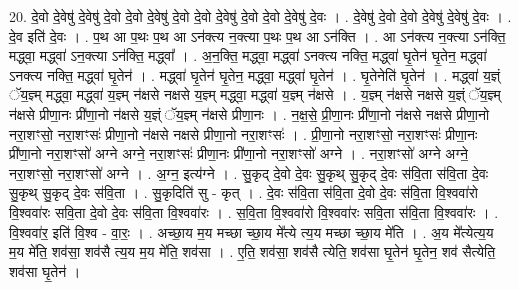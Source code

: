 \documentclass[17pt]{extarticle}
\begin{document}
20. दे॒वो दे॒वेषु॑ दे॒वेषु॑ दे॒वो दे॒वो दे॒वेषु॑ दे॒वो दे॒वो दे॒वेषु॑ दे॒वो दे॒वो दे॒वेषु॑ दे॒वः । . दे॒वेषु॑ दे॒वो दे॒वो दे॒वेषु॑ दे॒वेषु॑ दे॒वः । . दे॒व इति॑ दे॒वः । . प॒थ आ प॒थः प॒थ आ ऽन॑क्त्य न॒क्त्या प॒थः प॒थ आ ऽन॑क्ति । . आ ऽन॑क्त्य न॒क्त्या ऽन॑क्ति॒ मद्ध्वा॒ मद्ध्वा॑ ऽन॒क्त्या ऽन॑क्ति॒ मद्ध्वा᳚ । . अ॒न॒क्ति॒ मद्ध्वा॒ मद्ध्वा॑ ऽनक्त्य नक्ति॒ मद्ध्वा॑ घृ॒तेन॑ घृ॒तेन॒ मद्ध्वा॑ ऽनक्त्य नक्ति॒ मद्ध्वा॑ घृ॒तेन॑ । . मद्ध्वा॑ घृ॒तेन॑ घृ॒तेन॒ मद्ध्वा॒ मद्ध्वा॑ घृ॒तेन॑ । . घृ॒तेनेति॑ घृ॒तेन॑ । . मद्ध्वा॑ य॒ज्ञ्ं ॅय॒ज्ञ्म् मद्ध्वा॒ मद्ध्वा॑ य॒ज्ञ्म् न॑क्षसे नक्षसे य॒ज्ञ्म् मद्ध्वा॒ मद्ध्वा॑ य॒ज्ञ्म् न॑क्षसे । . य॒ज्ञ्म् न॑क्षसे नक्षसे य॒ज्ञ्ं ॅय॒ज्ञ्म् न॑क्षसे प्रीणा॒नः प्री॑णा॒नो न॑क्षसे य॒ज्ञ्ं ॅय॒ज्ञ्म् न॑क्षसे प्रीणा॒नः । . न॒क्ष॒से॒ प्री॒णा॒नः प्री॑णा॒नो न॑क्षसे नक्षसे प्रीणा॒नो नरा॒शꣳसो॒ नरा॒शꣳसः॑ प्रीणा॒नो न॑क्षसे नक्षसे प्रीणा॒नो नरा॒शꣳसः॑ । . प्री॒णा॒नो नरा॒शꣳसो॒ नरा॒शꣳसः॑ प्रीणा॒नः प्री॑णा॒नो नरा॒शꣳसो॑ अग्ने अग्ने॒ नरा॒शꣳसः॑ प्रीणा॒नः प्री॑णा॒नो नरा॒शꣳसो॑ अग्ने । . नरा॒शꣳसो॑ अग्ने अग्ने॒ नरा॒शꣳसो॒ नरा॒शꣳसो॑ अग्ने । . अ॒ग्न॒ इत्य॑ग्ने । . सु॒कृद् दे॒वो दे॒वः सु॒कृथ् सु॒कृद् दे॒वः स॑वि॒ता स॑वि॒ता दे॒वः सु॒कृथ् सु॒कृद् दे॒वः स॑वि॒ता । . सु॒कृदिति॑ सु - कृत् । . दे॒वः स॑वि॒ता स॑वि॒ता दे॒वो दे॒वः स॑वि॒ता वि॒श्ववा॑रो वि॒श्ववा॑रः सवि॒ता दे॒वो दे॒वः स॑वि॒ता वि॒श्ववा॑रः । . स॒वि॒ता वि॒श्ववा॑रो वि॒श्ववा॑रः सवि॒ता स॑वि॒ता वि॒श्ववा॑रः । . वि॒श्ववा॑र॒ इति॑ वि॒श्व - वा॒रः॒ । . अच्छा॒य म॒य मच्छा च्छा॒य मे᳚त्ये त्य॒य मच्छा च्छा॒य मे॑ति । . अ॒य मे᳚त्येत्य॒य म॒य मे॑ति॒ शव॑सा॒ शव॑सै त्य॒य म॒य मे॑ति॒ शव॑सा । . ए॒ति॒ शव॑सा॒ शव॑सै त्येति॒ शव॑सा घृ॒तेन॑ घृ॒तेन॒ शव॑ सैत्येति॒ शव॑सा घृ॒तेन॑ । \newline
\end{document}
